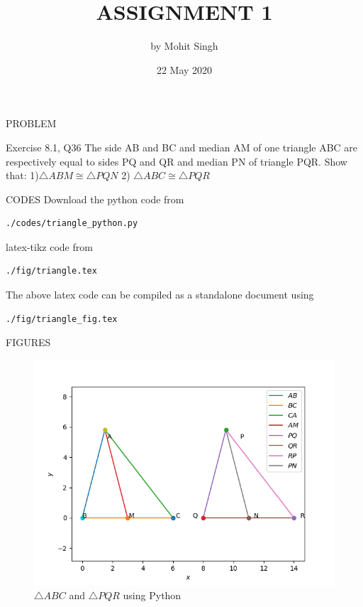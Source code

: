 \documentclass[11pt]{beamer}
\title{ASSIGNMENT 1}
\author{by Mohit Singh}
\institute{IIEST, Shibpur}
\date{22 May 2020}
\begin{document}
\maketitle
\begin{frame}{PROBLEM}
\begin{block}{Exercise 8.1, Q36}
The side AB and BC and median AM of one triangle ABC are respectively equal to sides PQ and QR and median PN of triangle PQR. Show that:
\newline
\newline
{1)$\triangle  ABM  \cong   \triangle  PQN $}
\newline
{2) $\triangle  ABC  \cong   \triangle  PQR $}
\end{block}

\end{frame}

\begin{frame}[containsverbatim]{CODES}
Download the python code from
\begin{lstlisting}
./codes/triangle_python.py
\end{lstlisting}
latex-tikz code from
\begin{lstlisting}
./fig/triangle.tex
\end{lstlisting}
The above latex code can be compiled as a standalone document using
\begin{lstlisting}
./fig/triangle_fig.tex
\end{lstlisting} 
\end{frame}

\begin{frame}{FIGURES}
\begin{figure}
\includegraphics[scale=0.5]{Figure_1.png}
\caption{$\triangle ABC$ and $\triangle PQR$ using Python}
\end{figure}
\end{frame}
\end{document}

